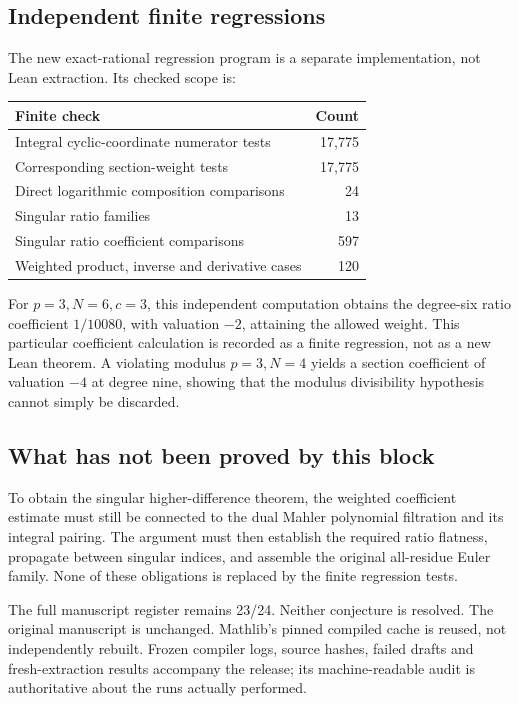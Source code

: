 \subsection*{Independent finite regressions}
The new exact-rational regression program is a separate implementation, not Lean extraction. Its checked scope is:
\begin{center}\begin{tabular}{lr}\toprule
Finite check & Count\\\midrule
Integral cyclic-coordinate numerator tests &17,775\\
Corresponding section-weight tests &17,775\\
Direct logarithmic composition comparisons &24\\
Singular ratio families &13\\
Singular ratio coefficient comparisons &597\\
Weighted product, inverse and derivative cases &120\\\bottomrule
\end{tabular}\end{center}
For $p=3,N=6,c=3$, this independent computation obtains the degree-six ratio coefficient $1/10080$, with valuation $-2$, attaining the allowed weight. This particular coefficient calculation is recorded as a finite regression, not as a new Lean theorem. A violating modulus $p=3,N=4$ yields a section coefficient of valuation $-4$ at degree nine, showing that the modulus divisibility hypothesis cannot simply be discarded.

\subsection*{What has not been proved by this block}
To obtain the singular higher-difference theorem, the weighted coefficient estimate must still be connected to the dual Mahler polynomial filtration and its integral pairing. The argument must then establish the required ratio flatness, propagate between singular indices, and assemble the original all-residue Euler family. None of these obligations is replaced by the finite regression tests.

The full manuscript register remains 23/24. Neither conjecture is resolved. The original manuscript is unchanged. Mathlib's pinned compiled cache is reused, not independently rebuilt. Frozen compiler logs, source hashes, failed drafts and fresh-extraction results accompany the release; its machine-readable audit is authoritative about the runs actually performed.
